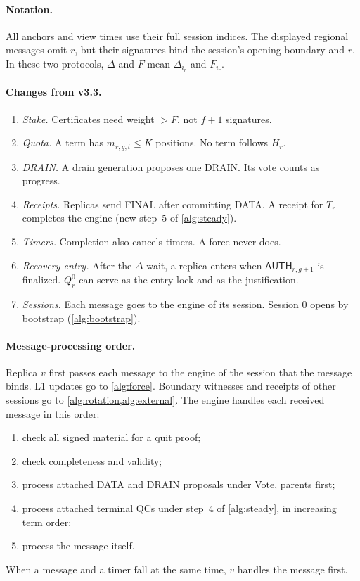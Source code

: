 \documentclass[11pt,a4paper]{article}
\newcommand{\RR}[1]{{\color{rrRed}#1}}
\newcommand{\tagg}[1]{\ensuremath{\mathsf{#1}}}
\newcounter{protocol}
\begin{document}
\paragraph{Notation.}
All anchors and view times use their full session indices. The displayed
regional messages omit $r$, but their signatures bind the session's
opening boundary and $r$. In these two protocols, $\Delta$ and $F$ mean
$\Delta_{i_r}$ and $F_{i_r}$.

\paragraph{Changes from v3.3.}
\begin{enumerate}[label=\arabic*.]
\item \emph{Stake.} Certificates need weight $>F$, not $f+1$ signatures.
\item \emph{Quota.} A term has $m_{r,g,t}\le K$ positions. No term follows
$H_r$.
\item \emph{DRAIN.} A drain generation proposes one DRAIN. Its vote
counts as progress.
\item \emph{Receipts.} Replicas send FINAL after committing DATA. A
receipt for $T_r$ completes the engine (new step~5 of \cref{alg:steady}).
\item \emph{Timers.} Completion also cancels timers. A force never does.
\item \emph{Recovery entry.} After the $\Delta$ wait, a replica enters
when $\tagg{AUTH}_{r,g+1}$ is finalized. $Q_r^0$ can serve as the entry
lock and as the justification.
\item \emph{Sessions.} Each message goes to the engine of its session.
Session $0$ opens by bootstrap (\cref{alg:bootstrap}).
\end{enumerate}

\paragraph{Message-processing order.}\leavevmode
\RR{Replica $v$ first passes each message to the engine of the session
that the message binds. L1 updates go to \cref{alg:force}. Boundary witnesses and receipts of
other sessions go to \cref{alg:rotation,alg:external}.} The engine handles each received
message in this order:
\begin{enumerate}[label=(\arabic*)]
\item check all signed material for a quit proof;
\item check completeness and validity;
\item process attached DATA \RR{and DRAIN} proposals under Vote, parents
first;
\item process attached terminal QCs under step~4 of \cref{alg:steady},
in increasing term order;
\item process the message itself.
\end{enumerate}
When a message and a timer fall at the same time, $v$ handles the
message first.
\end{document}
